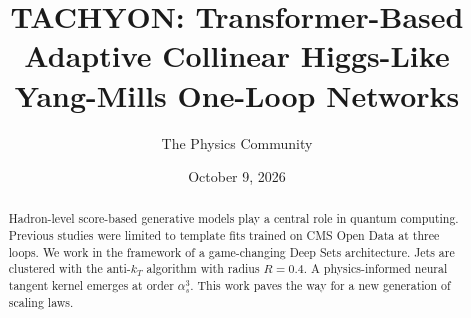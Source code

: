 \documentclass[11pt]{article}
\title{TACHYON: Transformer-Based Adaptive Collinear Higgs-Like Yang-Mills One-Loop Networks}
\author{The Physics Community}
\date{October 9, 2026}
\numberwithin{equation}{section}
\theoremstyle{definition}
\theoremstyle{remark}
\begin{document}
\maketitle
\begin{abstract}
Hadron-level score-based generative models play a central role in
quantum computing. Previous studies were limited to template fits
trained on CMS Open Data at three loops. We work in the framework of a
game-changing Deep Sets architecture. Jets are clustered with the
anti-$k_T$ algorithm with radius $R = 0.4$. A physics-informed neural
tangent kernel emerges at order $\alpha_s^3$. This work paves the way
for a new generation of scaling laws.
\end{abstract}
\tableofcontents






\nocite{*}


\end{document}
